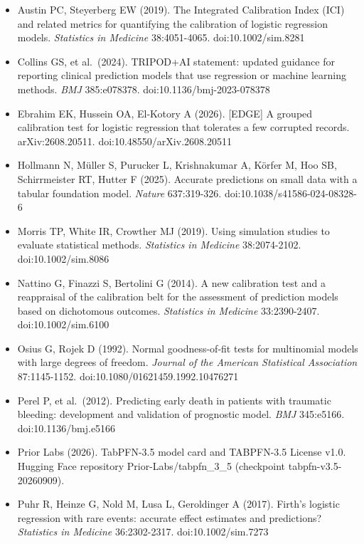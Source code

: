 \documentclass[
  10pt,
]{article}
\providecommand{\tightlist}{%
  \setlength{\itemsep}{0pt}\setlength{\parskip}{0pt}}
\begin{document}
\begin{itemize}
\tightlist
\item
  Austin PC, Steyerberg EW (2019). The Integrated
  Calibration Index (ICI) and related metrics for
  quantifying the calibration of logistic regression models.
  \emph{Statistics in Medicine} 38:4051-4065.
  doi:10.1002/sim.8281
\item
  Collins GS, et al.~(2024). TRIPOD+AI statement: updated
  guidance for reporting clinical prediction models that use
  regression or machine learning methods. \emph{BMJ}
  385:e078378. doi:10.1136/bmj-2023-078378
\item
  Ebrahim EK, Hussein OA, El-Kotory A (2026). {[}EDGE{]} A
  grouped calibration test for logistic regression that
  tolerates a few corrupted records. arXiv:2608.20511.
  doi:10.48550/arXiv.2608.20511
\item
  Hollmann N, Müller S, Purucker L, Krishnakumar A, Körfer
  M, Hoo SB, Schirrmeister RT, Hutter F (2025). Accurate
  predictions on small data with a tabular foundation model.
  \emph{Nature} 637:319-326. doi:10.1038/s41586-024-08328-6
\item
  Morris TP, White IR, Crowther MJ (2019). Using simulation
  studies to evaluate statistical methods. \emph{Statistics
  in Medicine} 38:2074-2102. doi:10.1002/sim.8086
\item
  Nattino G, Finazzi S, Bertolini G (2014). A new
  calibration test and a reappraisal of the calibration belt
  for the assessment of prediction models based on
  dichotomous outcomes. \emph{Statistics in Medicine}
  33:2390-2407. doi:10.1002/sim.6100
\item
  Osius G, Rojek D (1992). Normal goodness-of-fit tests for
  multinomial models with large degrees of freedom.
  \emph{Journal of the American Statistical Association}
  87:1145-1152. doi:10.1080/01621459.1992.10476271
\item
  Perel P, et al.~(2012). Predicting early death in patients
  with traumatic bleeding: development and validation of
  prognostic model. \emph{BMJ} 345:e5166.
  doi:10.1136/bmj.e5166
\item
  Prior Labs (2026). TabPFN-3.5 model card and TABPFN-3.5
  License v1.0. Hugging Face repository
  Prior-Labs/tabpfn\_3\_5 (checkpoint tabpfn-v3.5-20260909).
\item
  Puhr R, Heinze G, Nold M, Lusa L, Geroldinger A (2017).
  Firth's logistic regression with rare events: accurate
  effect estimates and predictions? \emph{Statistics in
  Medicine} 36:2302-2317. doi:10.1002/sim.7273

\end{itemize}
\end{document}
